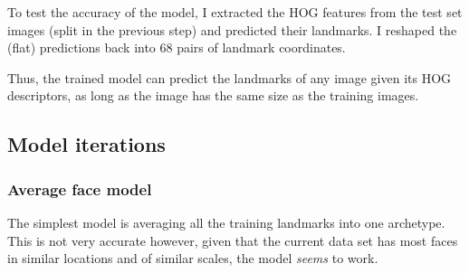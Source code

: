 \documentclass{article}
\begin{document}
To test the accuracy of the model, I extracted the HOG features from the test set images (split in the previous step) and predicted their landmarks. I reshaped the (flat) predictions back into 68 pairs of landmark coordinates.

Thus, the trained model can predict the landmarks of any image given its HOG descriptors, as long as the image has the same size as the training images.

\subsection{Model iterations}

\subsubsection{Average face model}
The simplest model is averaging all the training landmarks into one archetype. This is not very accurate however, given that the current data set has most faces in similar locations and of similar scales, the model \emph{seems} to work.
\end{document}
